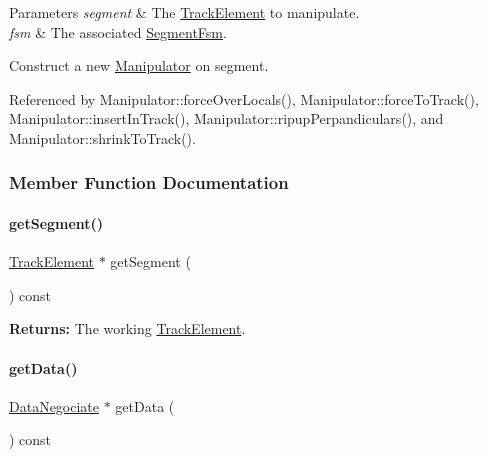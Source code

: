 \begin{DoxyParams}{Parameters}
{\em segment} & The \mbox{\hyperlink{classKite_1_1TrackElement}{Track\+Element}} to manipulate. \\
\hline
{\em fsm} & The associated \mbox{\hyperlink{classKite_1_1SegmentFsm}{Segment\+Fsm}}.\\
\hline
\end{DoxyParams}
Construct a new \mbox{\hyperlink{classKite_1_1Manipulator}{Manipulator}} on {\ttfamily segment}. 

Referenced by Manipulator\+::force\+Over\+Locals(), Manipulator\+::force\+To\+Track(), Manipulator\+::insert\+In\+Track(), Manipulator\+::ripup\+Perpandiculars(), and Manipulator\+::shrink\+To\+Track().



\subsubsection{Member Function Documentation}
\mbox{\label{classKite_1_1Manipulator_a506a4d1cef59fc35984c1c88e0c0f6df}} 
\paragraph{\texorpdfstring{get\+Segment()}{getSegment()}}
{\footnotesize\ttfamily \mbox{\hyperlink{classKite_1_1TrackElement}{Track\+Element}} $\ast$ get\+Segment (\begin{DoxyParamCaption}{ }\end{DoxyParamCaption}) const\hspace{0.3cm}{\ttfamily [inline]}}

{\bfseries Returns\+:} The working \mbox{\hyperlink{classKite_1_1TrackElement}{Track\+Element}}. \mbox{\label{classKite_1_1Manipulator_a54ca9d3c6d8ea145e053a37be8be8753}} 
\paragraph{\texorpdfstring{get\+Data()}{getData()}}
{\footnotesize\ttfamily \mbox{\hyperlink{classKite_1_1DataNegociate}{Data\+Negociate}} $\ast$ get\+Data (\begin{DoxyParamCaption}{ }\end{DoxyParamCaption}) const\hspace{0.3cm}{\ttfamily [inline]}}

